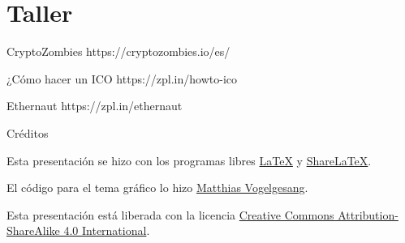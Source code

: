 \documentclass[10pt]{beamer}
\begin{document}
\section{Taller}

\begin{frame}{CryptoZombies}
  https://cryptozombies.io/es/
\end{frame}

\begin{frame}{¿Cómo hacer un ICO}
  https://zpl.in/howto-ico
\end{frame}

\begin{frame}{Ethernaut}
  https://zpl.in/ethernaut
\end{frame}

\begin{frame}{Créditos}

  Esta presentación se hizo con los programas libres \href{https://www.latex-project.org/}{LaTeX} y \href{https://www.sharelatex.com/}{ShareLaTeX}.

  El código para el tema gráfico lo hizo \href{https://github.com/matze/mtheme}{Matthias Vogelgesang}.
  
  Esta presentación está liberada con la licencia \href{http://creativecommons.org/licenses/by-sa/4.0/}{Creative Commons
  Attribution-ShareAlike 4.0 International}.

  \begin{center}\ccbysa\end{center}

\end{frame}
\end{document}
